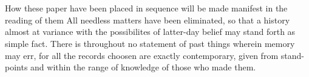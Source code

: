 \chapter*{}
How these paper have been placed in sequence will be made manifest in the reading of them
All needless matters have been eliminated, so that a history almost at variance with the possibilites of latter-day belief may stand forth as simple fact.
There is throughout no statement of past things wherein memory may err, for all the records choosen are exactly contemporary, given from stand-points and within the range of knowledge of those who made them.
